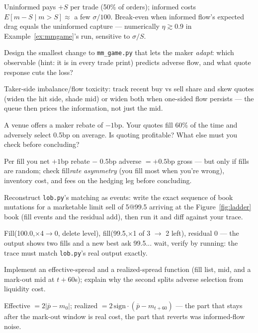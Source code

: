 \begin{solution}
Uninformed pays $+S$ per trade (50\% of orders); informed costs
$E[m-S\mid m>S]\approx$ a few $\sigma/100$. Break-even when informed
flow's expected drag equals the uninformed capture --- numerically
$\eta\gtrsim0.9$ in Example~\ref{ex:mmgame}'s run, sensitive to
$\sigma/S$.
\end{solution}
\begin{exercise}[hard]
Design the smallest change to \texttt{mm\_game.py} that lets the
maker \emph{adapt}: which observable (hint: it is in every trade
print) predicts adverse flow, and what quote response cuts the loss?
\end{exercise}
\begin{solution}
Taker-side imbalance/flow toxicity: track recent buy vs sell share
and skew quotes (widen the hit side, shade mid) or widen both when
one-sided flow persists --- the queue then prices the information,
not just the mid.
\end{solution}
\begin{exercise}[hard]
A venue offers a maker rebate of $-1$bp. Your quotes fill 60\% of
the time and adversely select 0.5bp on average. Is quoting
profitable? What else must you check before concluding?
\end{exercise}
\begin{solution}
Per fill you net $+1$bp rebate $-$ $0.5$bp adverse $=+0.5$bp gross
--- but only if fills are random; check fill\emph{rate asymmetry}
(you fill most when you're wrong), inventory cost, and fees on the
hedging leg before concluding.
\end{solution}
\begin{exercise}[hard]
Reconstruct \texttt{lob.py}'s matching as events: write the exact
sequence of book mutations for a marketable limit sell of 5@99.5
arriving at the Figure~\ref{fig:ladder} book (fill events and the
residual add), then run it and diff against your trace.
\end{exercise}
\begin{solution}
Fill(100.0,$\times$4$\to$0, delete level), fill(99.5,$\times$1 of 3
$\to$ 2 left), residual 0 --- the output shows two fills and a new
best ask 99.5... wait, verify by running: the trace must match
\texttt{lob.py}'s real output exactly.
\end{solution}
\begin{exercise}[hard]
Implement an effective-spread and a realized-spread function (fill
list, mid, and a mark-out mid at $t{+}60$s); explain why the second
splits adverse selection from liquidity cost.
\end{exercise}
\begin{solution}
Effective $=2|\bar p-m_0|$; realized $=2\,\mathrm{sign}\cdot
(\bar p-m_{t+60})$ --- the part that stays after the mark-out window
is real cost, the part that reverts was informed-flow noise.
\end{solution}

